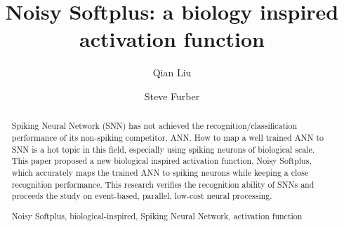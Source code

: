 \documentclass[runningheads,a4paper]{llncs}
\newcommand{\keywords}[1]{\par\addvspace\baselineskip
\noindent\keywordname\enspace\ignorespaces#1}
\begin{document}
\mainmatter  %

\title{Noisy Softplus: a biology inspired activation function}


%
%
\author{Qian Liu \and Steve Furber
}
%


%
%

\maketitle


\begin{abstract}
  Spiking Neural Network (SNN) has not achieved the recognition/classification performance of its non-spiking competitor, ANN.
  How to map a well trained ANN to SNN is a hot topic in this field, especially using spiking neurons of biological scale.
  This paper proposed a new biological inspired activation function, Noisy Softplus, which accurately maps the trained ANN to spiking neurons while keeping a close recognition performance.
  This research verifies the recognition ability of SNNs and proceeds the study on event-based, parallel, low-cost neural processing. 
\keywords{Noisy Softplus, biological-inspired, Spiking Neural Network, activation function}
\end{abstract}
\end{document}
